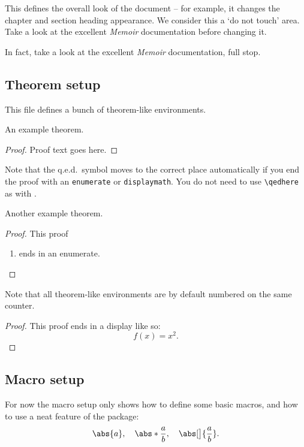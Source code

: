 This defines the overall look of the document -- for example, it
changes the chapter and section heading appearance.  We consider this
a `do not touch' area.  Take a look at the excellent \emph{Memoir}
documentation before changing it.

In fact, take a look at the excellent \emph{Memoir} documentation,
full stop.


\subsection{Theorem setup}

This file defines a bunch of theorem-like environments.

\begin{theorem}
  An example theorem.
\end{theorem}

\begin{proof}
  Proof text goes here.
\end{proof}

Note that the q.e.d.\ symbol moves to the correct place automatically
if you end the proof with an \texttt{enumerate} or
\texttt{displaymath}.  You do not need to use \verb-\qedhere- as with
.

\begin{theorem}
  Another example theorem.
\end{theorem}

\begin{proof}
  This proof
  \begin{enumerate}
  \item ends in an enumerate.
  \end{enumerate}
\end{proof}

\begin{proposition}
  Note that all theorem-like environments are by default numbered on
  the same counter.
\end{proposition}

\begin{proof}
  This proof ends in a display like so:
  \begin{displaymath}
    f(x) = x^2.
  \end{displaymath}
\end{proof}


\subsection{Macro setup}

For now the macro setup only shows how to define some basic macros,
and how to use a neat feature of the  package:
\begin{displaymath}
  \abs{a}, \quad \abs*{\frac{a}{b}}, \quad \abs[\big]{\frac{a}{b}}.
\end{displaymath}

